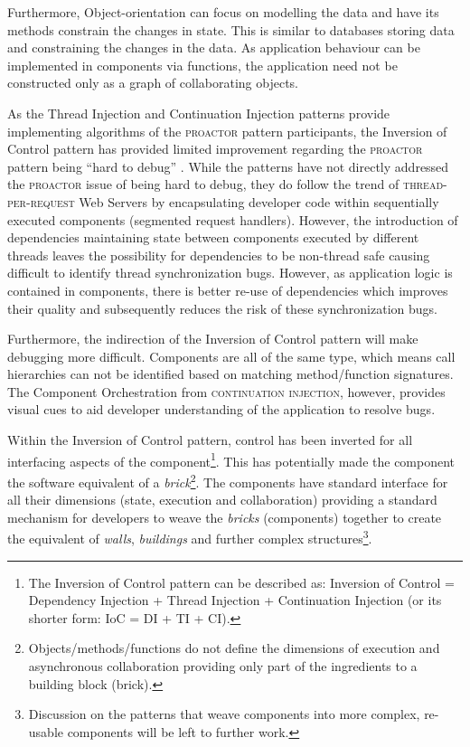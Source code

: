 \documentclass[prodmode]{style/acmlarge}
\begin{document}
Furthermore, Object-orientation can focus on modelling the data and have its
methods constrain the changes in state.  This is similar to databases storing
data and constraining the changes in the data.  As application behaviour can be
implemented in components via functions, the application need not be constructed
only as a graph of collaborating objects.

As the Thread Injection and Continuation Injection patterns provide implementing
algorithms of the \textsc{proactor} pattern participants, the Inversion of
Control pattern has provided limited improvement regarding the \textsc{proactor}
pattern being ``hard to debug'' \cite[p. 7]{proactor}.  While the patterns have
not directly addressed the \textsc{proactor} issue of being hard to debug, they
do follow the trend of \textsc{thread-per-request} Web Servers
\cite{thread-per-request} by encapsulating developer code within sequentially
executed components (segmented request handlers).  However, the
introduction of dependencies maintaining state between components executed by
different threads leaves the possibility for dependencies to be non-thread safe
causing difficult to identify thread synchronization bugs.  However, as
application logic is contained in components, there is better re-use of
dependencies which improves their quality and subsequently reduces the risk of
these synchronization bugs.

Furthermore, the indirection of the Inversion of Control pattern will make
debugging more difficult.  Components are all of the same type, which means call
hierarchies can not be identified based on matching method/function signatures. 
The Component Orchestration from \textsc{continuation injection}, however,
provides visual cues to aid developer understanding of the application to
resolve bugs.

Within the Inversion of Control pattern, control has been inverted for all
interfacing aspects of the component\footnote{The Inversion of Control pattern
can be described as: Inversion of Control = Dependency Injection + Thread
Injection + Continuation Injection (or its shorter form: IoC = DI + TI + CI).}. 
This has potentially made the component the software equivalent of a
\textit{brick}\footnote{Objects/methods/functions do not define the dimensions
of execution and asynchronous collaboration providing only part of the
ingredients to a building block (brick).}.  The components have standard
interface for all their dimensions (state, execution and collaboration)
providing a standard mechanism for developers to weave the \textit{bricks}
(components) together to create the equivalent of \textit{walls},
\textit{buildings} and further complex structures\footnote{Discussion on the
patterns that weave components into more complex, re-usable components will be
left to further work.}.
\end{document}
